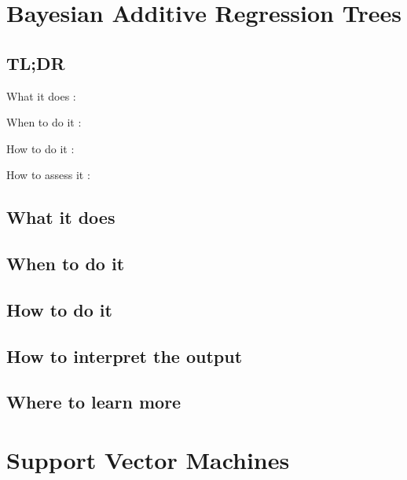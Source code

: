 \documentclass[
]{book}
\begin{document}
\hypertarget{bayesian-additive-regression-trees}{%
\chapter{Bayesian Additive Regression Trees}\label{bayesian-additive-regression-trees}}

\hypertarget{tldr-19}{%
\section{TL;DR}\label{tldr-19}}

What it does
:

When to do it
:

How to do it
:

How to assess it
:

\hypertarget{what-it-does-19}{%
\section{What it does}\label{what-it-does-19}}

\hypertarget{when-to-do-it-19}{%
\section{When to do it}\label{when-to-do-it-19}}

\hypertarget{how-to-do-it-19}{%
\section{How to do it}\label{how-to-do-it-19}}

\hypertarget{how-to-interpret-the-output-19}{%
\section{How to interpret the output}\label{how-to-interpret-the-output-19}}

\hypertarget{where-to-learn-more-19}{%
\section{Where to learn more}\label{where-to-learn-more-19}}

\hypertarget{support-vector-machines}{%
\chapter{Support Vector Machines}\label{support-vector-machines}}
\end{document}
